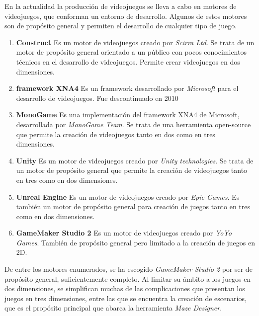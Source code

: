En la actualidad la producción de videojuegos se lleva a cabo en motores de videojuegos, que conforman un entorno de desarrollo. Algunos de estos motores son de propósito general y permiten el desarrollo de cualquier tipo de juego.
\begin{enumerate}
	\item \textbf{Construct\cite{construct}} Es un motor de videojuegos creado por \textit{Scirra Ltd}. Se trata de un motor de propósito general orientado a un público con pocos conocimientos técnicos en el desarrollo de videojuegos. Permite crear videojuegos en dos dimensiones.
	\item \textbf{framework XNA4\cite{xna4}} Es un framework desarrollado por \textit{Microsoft} para el desarrollo de videojuegos. Fue descontinuado en 2010
	\item \textbf{MonoGame\cite{monogame}} Es una implementación del framework XNA4 de Microsoft, desarrollada por \textit{MonoGame Team}. Se trata de una herramienta open-source que permite la creación de videojuegos tanto en dos como en tres dimensiones.
	\item \textbf{Unity\cite{unity}} Es un motor de videojuegos creado por \textit{Unity technologies}. Se trata de un motor de propósito general que permite la creación de videojuegos tanto en tres como en dos dimensiones.
	\item \textbf{Unreal Engine\cite{unreal}} Es un motor de videojuegos creado por \textit{Epic Games}. Es también un motor de propósito general para creación de juegos tanto en tres como en dos dimensiones.
	\item \textbf{GameMaker Studio 2\cite{gamemaker}} Es un motor de videojuegos creado por \textit{YoYo Games}. También de propósito general pero limitado a la creación de juegos en 2D.
\end{enumerate}

De entre los motores enumerados, se ha escogido \textit{GameMaker Studio 2} por ser de propósito general, suficientemente completo. Al limitar su ámbito a los juegos en dos dimensiones, se simplifican muchas de las complicaciones que presentan los juegos en tres dimensiones, entre las que se encuentra la creación de escenarios, que es el propósito principal que abarca la herramienta \textit{Maze Designer}.